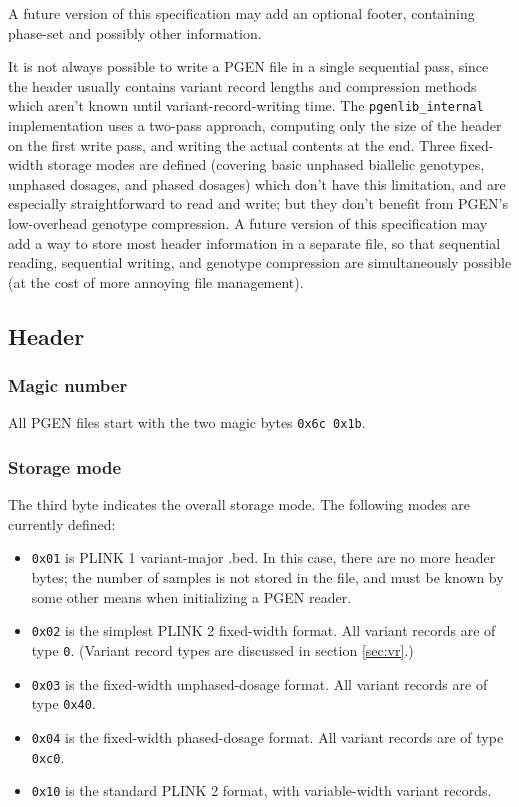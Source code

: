 \documentclass[8pt]{article}
\begin{document}
A future version of this specification may add an optional footer, containing
phase-set and possibly other information.

It is not always possible to write a PGEN file in a single sequential pass,
since the header usually contains variant record lengths and compression
methods which aren't known until variant-record-writing time.  The
\texttt{pgenlib\_internal} implementation uses a two-pass approach, computing
only the size of the header on the first write pass, and writing the actual
contents at the end.  Three fixed-width storage modes are defined (covering
basic unphased biallelic genotypes, unphased dosages, and phased dosages) which
don't have this limitation, and are especially straightforward to read and
write; but they don't benefit from PGEN's low-overhead genotype compression.  A
future version of this specification may add a way to store most header
information in a separate file, so that sequential reading, sequential writing,
and genotype compression are simultaneously possible (at the cost of more
annoying file management).

\subsection{Header}

\subsubsection{Magic number}

All PGEN files start with the two magic bytes \texttt{0x6c 0x1b}.

\subsubsection{Storage mode}

The third byte indicates the overall storage mode.  The following modes are
currently defined:

\begin{itemize}
  \itemsep0em
\item \texttt{0x01} is PLINK 1 variant-major .bed.  In this case, there are no
  more header bytes; the number of samples is not stored in the file, and must
  be known by some other means when initializing a PGEN reader.
\item \texttt{0x02} is the simplest PLINK 2 fixed-width format.  All variant
  records are of type \texttt{0}.  (Variant record types are discussed in
  section \ref{sec:vr}.)
\item \texttt{0x03} is the fixed-width unphased-dosage format.  All variant
  records are of type \texttt{0x40}.
\item \texttt{0x04} is the fixed-width phased-dosage format.  All variant
  records are of type \texttt{0xc0}.
\item \texttt{0x10} is the standard PLINK 2 format, with variable-width variant
  records.
\end{itemize}
\end{document}
